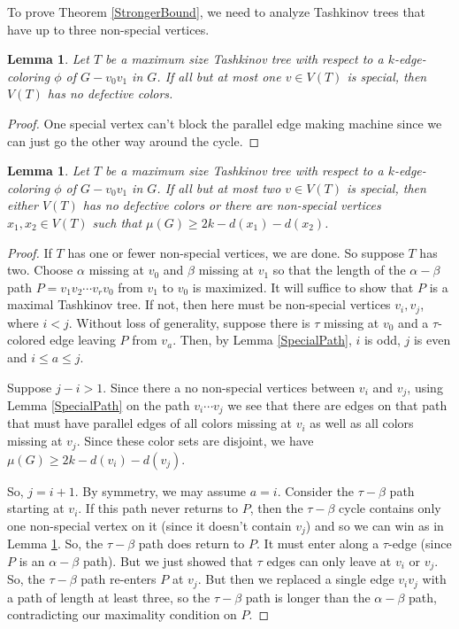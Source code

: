 \documentclass[12pt]{amsart}
\theoremstyle{plain}
\newtheorem{lem}[thm]{Lemma}
\theoremstyle{definition}
\theoremstyle{remark}
\begin{document}
To prove Theorem \ref{StrongerBound}, we need to analyze Tashkinov trees that have up to three non-special vertices.

\begin{lem}\label{AtMostOneNonSpecial}
Let $T$ be a maximum size Tashkinov tree with respect to a $k$-edge-coloring
$\phi$ of $G - v_0v_1$ in $G$.  If all but at most one $v \in V(T)$ is special, then $V(T)$
has no defective colors.
\end{lem}
\begin{proof}
One special vertex can't block the parallel edge making machine since we can just go the other way around the cycle.
\end{proof}

\begin{lem}\label{AtMostTwoNonSpecial}
Let $T$ be a maximum size Tashkinov tree with respect to a $k$-edge-coloring
$\phi$ of $G - v_0v_1$ in $G$.  If all but at most two $v \in V(T)$ is special, then either $V(T)$
has no defective colors or there are non-special vertices $x_1, x_2 \in V(T)$ such that $\mu(G) \ge 2k - d(x_1) - d(x_2)$.
\end{lem}
\begin{proof}
If $T$ has one or fewer non-special vertices, we are done.  So suppose $T$ has two.  Choose $\alpha$ missing at
$v_0$ and $\beta$ missing at $v_1$ so that the length of the $\alpha-\beta$ path $P = v_1v_2\cdots v_rv_0$ from $v_1$ to $v_0$ is maximized.  
It will suffice to show that $P$ is a maximal Tashkinov tree.  If not, then here must be non-special vertices $v_i, v_j$, where $i < j$.  Without loss of generality,
suppose there is $\tau$ missing at $v_0$ and a $\tau$-colored edge leaving $P$ from $v_a$.  Then, by Lemma \ref{SpecialPath}, $i$ is odd, $j$ is even and $i \le a \le j$.  

Suppose $j-i > 1$.  Since there a no non-special vertices between $v_i$ and $v_j$, using Lemma \ref{SpecialPath} on the path $v_i\cdots v_j$ we see that there are edges on that path that must
have parallel edges of all colors missing at $v_i$ as well as all colors missing at $v_j$.  Since these color sets are disjoint, we have $\mu(G) \ge 2k - d(v_i) - d(v_j)$.

So, $j = i + 1$.  By symmetry, we may assume $a = i$.  Consider the $\tau-\beta$ path starting at $v_i$.  If this path never returns to $P$, then the $\tau-\beta$ cycle contains only one non-special vertex on it
(since it doesn't contain $v_j$) and so we can win as in Lemma \ref{AtMostOneNonSpecial}.  So, the $\tau-\beta$ path does return to $P$.  It must enter along a $\tau$-edge (since $P$ is an $\alpha-\beta$ path).  
But we just showed that $\tau$ edges can only leave at $v_i$ or $v_j$.  So, the $\tau-\beta$ path re-enters $P$ at $v_j$.  But then we replaced a single edge $v_iv_j$ with a path of length at least three, 
so the $\tau-\beta$ path is longer than the $\alpha-\beta$ path, contradicting our maximality condition on $P$.
\end{proof}
\end{document}
